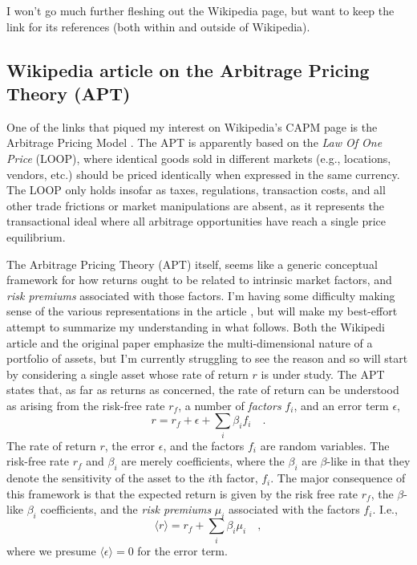 I won't go much further fleshing out the Wikipedia page, but want to keep the link \cite{CAPM2026} for its references (both within and outside of Wikipedia).


\subsection{Wikipedia article on the Arbitrage Pricing Theory (APT)}

One of the links that piqued my interest on Wikipedia's CAPM page \cite{CAPM2026} is the Arbitrage Pricing Model \cite{APT2026}.  The APT is apparently based on the {\it Law Of One Price} (LOOP), where identical goods sold in different markets (e.g., locations, vendors, etc.) should be priced identically when expressed in the same currency.  The LOOP only holds insofar as taxes, regulations, transaction costs, and all other trade frictions or market manipulations are absent, as it represents the transactional ideal where all arbitrage opportunities have reach a single price equilibrium.

The Arbitrage Pricing Theory (APT) itself, seems like a generic conceptual framework for how returns ought to be related to intrinsic market factors, and {\it risk premiums} associated with those factors.  I'm having some difficulty making sense of the various representations in the article \cite{APT2026}, but will make my best-effort attempt to summarize my understanding in what follows.  Both the Wikipedi article and the original paper \cite{Ross1976} emphasize the multi-dimensional nature of a portfolio of assets, but I'm currently struggling to see the reason and so will start by considering a single asset whose rate of return $r$ is under study.  The APT states that, as far as returns as concerned, the rate of return can be understood as arising from the risk-free rate $r_f$, a number of {\it factors} $f_i$, and an error term $\epsilon$,
\begin{equation}
    r = r_f + \epsilon + \sum_i \beta_i f_i \quad.
\end{equation}
The rate of return $r$, the error $\epsilon$, and the factors $f_i$ are random variables.  The risk-free rate $r_f$ and $\beta_i$ are merely coefficients, where the $\beta_i$ are $\beta$-like in that they denote the sensitivity of the asset to the $i$th factor, $f_i$.  The major consequence of this framework is that the expected return is given by the risk free rate $r_f$, the $\beta$-like $\beta_i$ coefficients, and the {\it risk premiums} $\mu_i$ associated with the factors $f_i$.  I.e.,
\begin{equation}
    \langle r \rangle = r_f + \sum_i \beta_i \mu_i \quad ,
\end{equation}
where we presume $\langle \epsilon \rangle = 0$ for the error term.

